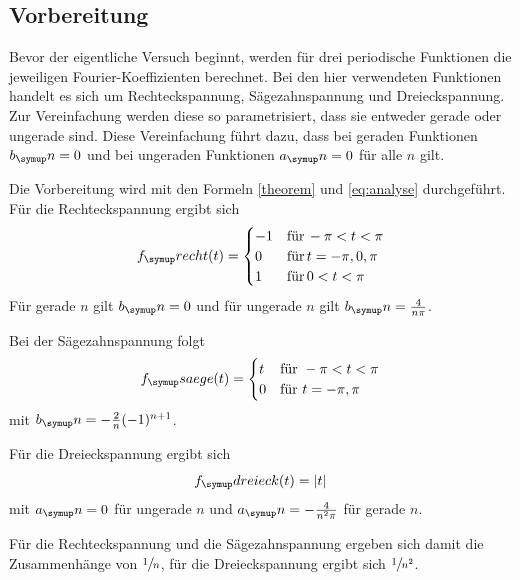 \subsection{Vorbereitung}
Bevor der eigentliche Versuch beginnt, werden für drei periodische Funktionen
die jeweiligen Fourier-Koeffizienten berechnet.
Bei den hier verwendeten Funktionen handelt es
sich um Rechteckspannung, Sägezahnspannung und Dreieckspannung. Zur Vereinfachung
werden diese so parametrisiert, dass sie entweder gerade oder ungerade sind.
Diese Vereinfachung führt dazu, dass bei geraden Funktionen $b_\su{n}=0$ und bei
ungeraden Funktionen $a_\su{n}=0$ für alle $n$ gilt.
\par
\noindent Die Vorbereitung wird mit den Formeln \eqref{theorem} und \eqref{eq:analyse} durchgeführt.
Für die Rechteckspannung ergibt sich
\[f_\su{recht}(t)=\begin{cases}
-1 & \text{für}\, -\pi<t<\pi\\
0 & \text{für}\, t=-\pi,0,\pi\\
1 &\text{für}\,  0<t<\pi \\
\end{cases}\]
Für gerade $n$ gilt $b_\su{n} = 0$ und für ungerade $n$ gilt $b_\su{n} = \frac{4}{n\pi}$.
\par
\noindent Bei der Sägezahnspannung folgt
\[f_\su{saege}(t)=\begin{cases}
t & \text{für}\,\, -\pi<t<\pi\\
0 & \text{für}\,\, t=-\pi,\pi\\
\end{cases}\]
mit $b_\su{n} = -\frac{2}{n}(-1)^{n+1}$.
\par
\noindent Für die Dreieckspannung ergibt sich
\begin{equation}
  f_\su{dreieck}(t) = |t|
\end{equation}
mit $a_\su{n} = 0$ für ungerade $n$ und $a_\su{n} = -\frac{4}{n^2\pi}$ für gerade $n$.
\par
\noindent Für die Rechteckspannung und die Sägezahnspannung ergeben sich damit die Zusammenhänge
von $\sfrac{1}{n}$, für die Dreieckspannung ergibt sich $\sfrac{1}{n^2}$.
